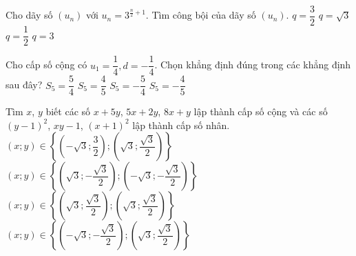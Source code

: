 \begin{ex}%
Cho dãy số $\left(u_{n}\right)$ với $u_{n}=3^{\tfrac{n}{2}+1}$. Tìm công bội của dãy số $\left(u_{n}\right)$.
\choice
{$q=\dfrac{3}{2}$}
{\True $q=\sqrt{3}$}
{$q=\dfrac{1}{2}$}
{$q=3$}
\end{ex}

\begin{ex}%
Cho cấp số cộng có $u_1=\dfrac{1}{4},d=-\dfrac{1}{4}$. Chọn khẳng định đúng trong các khẳng định sau đây?
\choice
{$S_5=\dfrac{5}{4}$}
{$S_5=\dfrac{4}{5}$}
{\True $S_5=-\dfrac{5}{4}$}
{$S_5=-\dfrac{4}{5}$}
\end{ex}

\begin{ex}%
Tìm $x$, $y$ biết các số $x+5y$, $5x+2y$, $8x+y$ lập thành cấp số cộng và các số $(y-1)^{2}$, $xy-1$, $(x+1)^{2}$ lập thành cấp số nhân.
\choice
{$(x; y)\in\left\{\left(-\sqrt{3}; \dfrac {3}{2}\right) ;\left(\sqrt{3} ; \dfrac {\sqrt{3}}{2}\right)\right\}$}
{$(x ; y)\in\left\{\left(\sqrt{3} ;-\dfrac {\sqrt{3}}{2}\right) ;\left(-\sqrt{3} ;-\dfrac {\sqrt{3}}{2}\right)\right\}$}
{$(x ; y)\in\left\{\left(\sqrt{3} ; \dfrac {\sqrt{3}}{2}\right) ;\left(\sqrt{3} ; \dfrac {\sqrt{3}}{2}\right)\right\}$}
{\True $(x ; y)\in\left\{\left(-\sqrt{3} ;-\dfrac {\sqrt{3}}{2}\right) ;\left(\sqrt{3} ; \dfrac {\sqrt{3}}{2}\right)\right\}$}
\end{ex}

